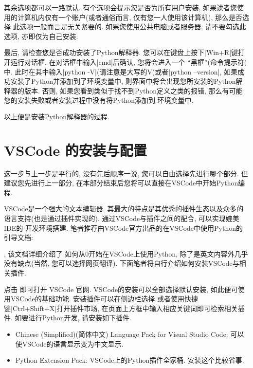 \documentclass[11pt]{article}
\newcommand{\bhref}[2]{
    \href{#1}{\color{blue}{#2}}
}
\begin{document}
其余选项都可以一路默认. 有个选项会提示您是否为所有用户安装, 如果读者您使用的计算机内仅有一个账户(或者通俗而言, 仅有您一人使用该计算机), 那么是否选择
此选项一般而言是无关紧要的. 如果您使用公共电脑或者服务器, 请不要勾选此选项, 亦即仅为自己安装. 

最后, 请检查您是否成功安装了Python解释器. 您可以在键盘上按下\cverb|Win+R|键打开运行对话框, 在对话框中输入\cverb|cmd|后确认, 您将会进入一个
``黑框''(命令提示符)中. 此时在其中输入\cverb|python -V|(请注意是大写的V)或者\cverb|python --version|, 如果成功安装了Python并添加到了环境变量中,
则界面中将会出现您所安装的Python解释器的版本. 否则, 如果您看到类似于找不到Python定义之类的报错, 那么有可能您的安装失败或者安装过程中没有将Python添加到
环境变量中.

以上便是安装Python解释器的过程.

\section{VSCode 的安装与配置}\label{VSCode}
这一步与上一步是平行的, 没有先后顺序一说, 您可以自由选择先进行哪个部分. 但建议您先进行上一部分, 在本部分结束后您将可以直接在VSCode中开始Python编程.

VSCode是一个强大的文本编辑器. 其最大的特点是其优秀的插件生态以及众多的语言支持(也是通过插件实现的). 通过VSCode与插件之间的配合, 可以实现媲美IDE的
开发环境搭建. 笔者推荐由VSCode官方出品的在VSCode中使用Python的引导文档: 
\bhref{https://code.visualstudio.com/docs/languages/python}{Python in Visual Studio Code}, 该文档详细介绍了
如何从0开始在VSCode上使用Python, 除了是英文内容外几乎没有缺点(当然, 您可以选择网页翻译).
下面笔者将自行介绍如何安装VSCode与相关插件.

点击\bhref{https://code.visualstudio.com/}{\underline{此处}}即可打开 VSCode 官网.
VSCode的安装可以全部选择默认安装, 如此便可使用VSCode的基础功能. 安装插件可以在侧边栏选择
或者使用快捷键\cverb|Ctrl+Shift+X|打开插件市场, 在页面上方框中输入相应关键词即可检索相关插件. 如要进行Python开发, 请安装如下插件.
\begin{itemize}
    \item Chinese (Simplified)(简体中文) Language Pack for Visual Studio Code: 可以使VSCode的语言显示变为中文显示.
    \item Python Extension Pack: VSCode上的Python插件全家桶. 安装这个比较省事.
\end{itemize}
\end{document}
